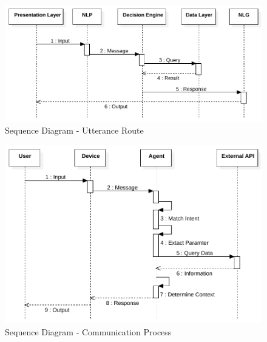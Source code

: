 \documentclass{scrreprt}
\begin{document}
\clearpage
\begin{figure}[ht!]
    \centering
    \includegraphics[angle=90, height=.95\textheight]{img2/SequenceDiagram2.pdf}
    \caption{Sequence Diagram - Utterance Route}
    \label{fig:sequence2}
\end{figure}




\clearpage

\begin{figure}[ht!]
    \centering
    \includegraphics[angle=90, height=.95\textheight]{imgs/SequenceDiagram1.pdf}
    \caption{Sequence Diagram - Communication Process}
    \label{fig:sequencediagram1}
\end{figure}

\clearpage
\end{document}
